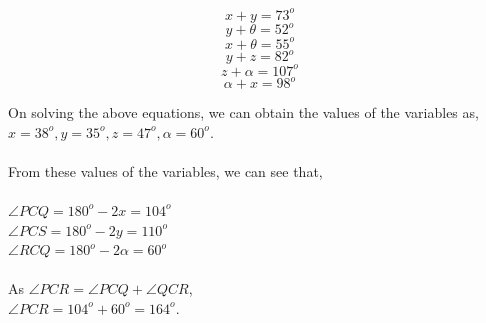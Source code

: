 \documentclass[8pt, twocolumn]{article}
\begin{document}
\begin{equation}
    x + y = 73^o
\end{equation}
\begin{equation}
    y + \theta = 52^o
\end{equation}
\begin{equation}
    x + \theta = 55^o
\end{equation}
\begin{equation}
    y + z = 82^o
\end{equation}
\begin{equation}
    z + \alpha = 107^o
\end{equation}
\begin{equation}
    \alpha + x = 98^o
\end{equation}

On solving the above equations, we can obtain the values of the variables as, $x = 38^o, y = 35^o, z = 47^o, \alpha = 60^o .$\\\\
From these values of the variables, we can see that,\\\\
$\angle PCQ = 180^o - 2x = 104^o$\\
$\angle PCS = 180^o - 2y = 110^o$\\
$\angle RCQ = 180^o - 2\alpha = 60^o$\\\\
As $\angle PCR = \angle PCQ +\angle QCR$,\\ $\angle PCR = 104^o + 60^o = 164^o$.\\
\end{document}
